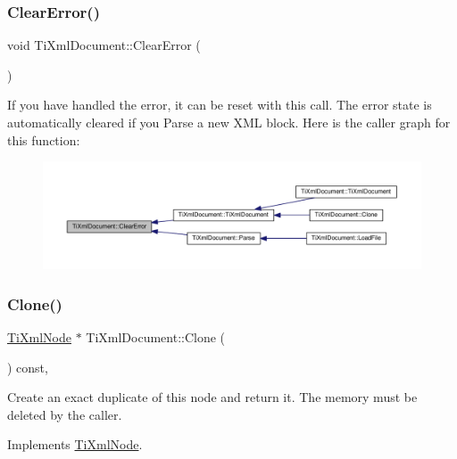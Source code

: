 \subsubsection{\texorpdfstring{Clear\+Error()}{ClearError()}}
{\footnotesize\ttfamily void Ti\+Xml\+Document\+::\+Clear\+Error (\begin{DoxyParamCaption}{ }\end{DoxyParamCaption})\hspace{0.3cm}{\ttfamily [inline]}}

If you have handled the error, it can be reset with this call. The error state is automatically cleared if you Parse a new X\+ML block. Here is the caller graph for this function\+:\nopagebreak
\begin{figure}[H]
\begin{center}
\leavevmode
\includegraphics[width=350pt]{class_ti_xml_document_ac66b8c28db86363315712a3574e87c35_icgraph}
\end{center}
\end{figure}
\mbox{\label{class_ti_xml_document_a46a4dda6c56eb106d46d4046ae1e5353}} 
\subsubsection{\texorpdfstring{Clone()}{Clone()}}
{\footnotesize\ttfamily \hyperlink{class_ti_xml_node}{Ti\+Xml\+Node} $\ast$ Ti\+Xml\+Document\+::\+Clone (\begin{DoxyParamCaption}{ }\end{DoxyParamCaption}) const\hspace{0.3cm}{\ttfamily [protected]}, {\ttfamily [virtual]}}

Create an exact duplicate of this node and return it. The memory must be deleted by the caller. 

Implements \hyperlink{class_ti_xml_node_a4508cc3a2d7a98e96a54cc09c37a78a4}{Ti\+Xml\+Node}.

